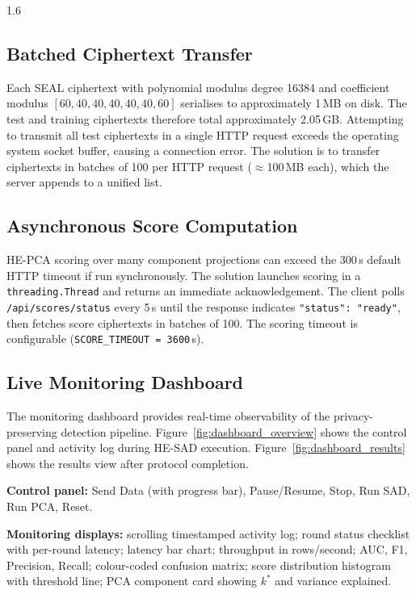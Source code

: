 \begin{spacing}{1.6}

\subsection{Batched Ciphertext Transfer}

Each SEAL ciphertext with polynomial modulus degree 16384 and coefficient
modulus $[60,40,40,40,40,40,60]$ serialises to approximately 1\,MB on disk.
The test and training ciphertexts therefore total approximately 2.05\,GB.
Attempting to transmit all test ciphertexts in a single HTTP request exceeds
the operating system socket buffer, causing a connection error. The solution
is to transfer ciphertexts in batches of 100 per HTTP request
($\approx$100\,MB each), which the server appends to a unified list.

\subsection{Asynchronous Score Computation}

HE-PCA scoring over many component projections can exceed the 300\,s default
HTTP timeout if run synchronously. The solution launches scoring in a
\texttt{threading.Thread} and returns an immediate acknowledgement. The client
polls \texttt{/api/scores/status} every 5\,s until the response indicates
\texttt{"status": "ready"}, then fetches score ciphertexts in batches of 100.
The scoring timeout is configurable (\texttt{SCORE\_TIMEOUT = 3600}\,s).

\subsection{Live Monitoring Dashboard}

The monitoring dashboard provides real-time observability of the
privacy-preserving detection pipeline. Figure~\ref{fig:dashboard_overview}
shows the control panel and activity log during HE-SAD execution.
Figure~\ref{fig:dashboard_results} shows the results view after protocol
completion.

\textbf{Control panel:} Send Data (with progress bar), Pause/Resume, Stop,
Run SAD, Run PCA, Reset.

\textbf{Monitoring displays:} scrolling timestamped activity log; round
status checklist with per-round latency; latency bar chart; throughput in
rows/second; AUC, F1, Precision, Recall; colour-coded confusion matrix;
score distribution histogram with threshold line; PCA component card
showing $k^*$ and variance explained.

\end{spacing}

